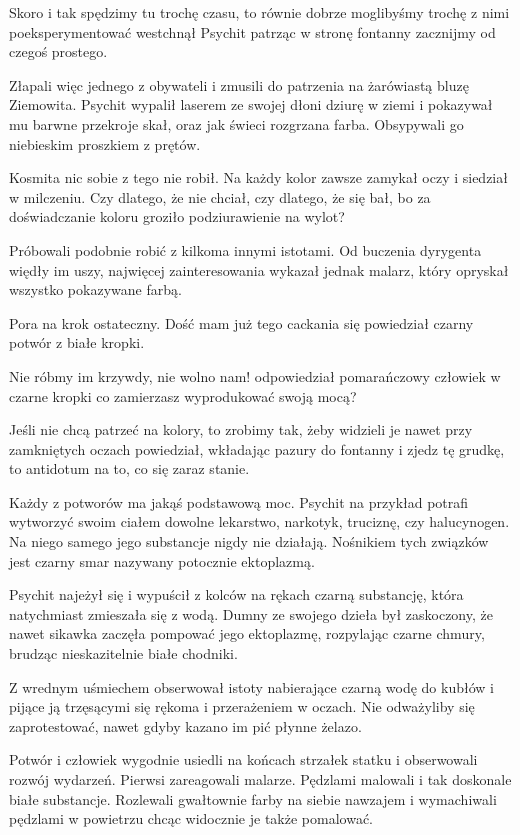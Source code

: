 \divider{}
\ds{} Skoro i tak spędzimy tu trochę czasu, to równie dobrze moglibyśmy trochę z nimi poeksperymentować \dm{} westchnął Psychit patrząc w stronę fontanny \dm{}
zacznijmy od czegoś prostego. \de{}

Złapali więc jednego z obywateli i zmusili do patrzenia na żarówiastą bluzę Ziemowita.
Psychit wypalił laserem ze swojej dłoni dziurę w ziemi i pokazywał mu barwne przekroje skał, oraz jak świeci rozgrzana farba.
Obsypywali go niebieskim proszkiem z prętów.

Kosmita nic sobie z tego nie robił. 
Na każdy kolor zawsze zamykał oczy i siedział w milczeniu.
Czy dlatego, że nie chciał, czy dlatego, że się bał, bo za doświadczanie koloru groziło podziurawienie na wylot?

Próbowali podobnie robić z kilkoma innymi istotami.
Od buczenia dyrygenta więdły im uszy, najwięcej zainteresowania wykazał jednak malarz, który opryskał wszystko pokazywane farbą.

\ds{} Pora na krok ostateczny. Dość mam już tego cackania się \dm{} powiedział czarny potwór z białe kropki. \de{}

\ds{} Nie róbmy im krzywdy, nie wolno nam! \dm{} odpowiedział pomarańczowy człowiek w czarne kropki \dm{} co zamierzasz wyprodukować swoją mocą? \de{}

\ds{} Jeśli nie chcą patrzeć na kolory, to zrobimy tak, żeby widzieli je nawet przy zamkniętych oczach \ds{} powiedział, wkładając pazury do fontanny \dm{} 
i zjedz tę grudkę, to antidotum na to, co się zaraz stanie. \de{}

Każdy z potworów ma jakąś podstawową moc. Psychit na przykład potrafi wytworzyć swoim ciałem dowolne lekarstwo, narkotyk, truciznę, czy halucynogen. Na niego samego jego substancje nigdy nie działają.
Nośnikiem tych związków jest czarny smar nazywany potocznie ektoplazmą.

Psychit najeżył się i wypuścił z kolców na rękach czarną substancję, która natychmiast zmieszała się z wodą.
Dumny ze swojego dzieła był zaskoczony, że nawet sikawka zaczęła pompować jego ektoplazmę, rozpylając czarne chmury, brudząc nieskazitelnie białe chodniki.

Z wrednym uśmiechem obserwował istoty nabierające czarną wodę do kubłów i pijące ją trzęsącymi się rękoma i przerażeniem w oczach.
Nie odważyliby się zaprotestować, nawet gdyby kazano im pić płynne żelazo.

\divider{}
Potwór i człowiek wygodnie usiedli na końcach strzałek statku i obserwowali rozwój wydarzeń.
Pierwsi zareagowali malarze. Pędzlami malowali i tak doskonale białe substancje. 
Rozlewali gwałtownie farby na siebie nawzajem i wymachiwali pędzlami w powietrzu chcąc widocznie je także pomalować.

